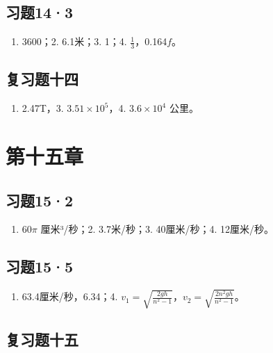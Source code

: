 \subsection{习题14·3}\label{ux4e60ux9898143-1}

\begin{enumerate}
\def\labelenumi{\arabic{enumi}.}
\tightlist
\item
  3600；2. 6.1米；3. 1；4. \(\frac{1}{3}\)，0.164\(f\)。
\end{enumerate}

\subsection{复习题十四}\label{ux590dux4e60ux9898ux5341ux56db-1}

\begin{enumerate}
\def\labelenumi{\arabic{enumi}.}
\setcounter{enumi}{1}
\tightlist
\item
  2.47T，3. \(3.51 \times 10^{5}\)，4. \(3.6 \times 10^{4}\) 公里。
\end{enumerate}

\section{第十五章}\label{ux7b2cux5341ux4e94ux7ae0}

\subsection{习题15·2}\label{ux4e60ux9898152-1}

\begin{enumerate}
\def\labelenumi{\arabic{enumi}.}
\tightlist
\item
  \(60\pi\) 厘米³/秒；2. 3.7米/秒；3. 40厘米/秒；4. 12厘米/秒。
\end{enumerate}

\subsection{习题15·5}\label{ux4e60ux9898155-1}

\begin{enumerate}
\def\labelenumi{\arabic{enumi}.}
\setcounter{enumi}{2}
\tightlist
\item
  63.4厘米/秒，6.34；4.
  \(v_{1}=\sqrt{\frac{2gh}{n^{2}-1}}\)，\(v_{2}=\sqrt{\frac{2n^{2}gh}{n^{2}-1}}\)。
\end{enumerate}

\subsection{复习题十五}\label{ux590dux4e60ux9898ux5341ux4e94-1}

